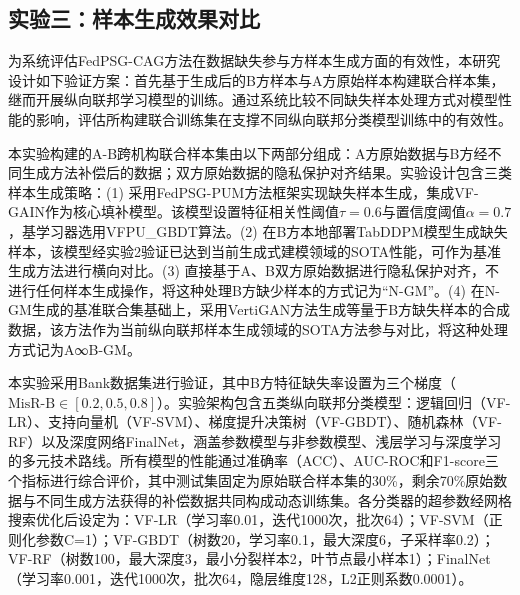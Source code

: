 \subsection{实验三：样本生成效果对比}
为系统评估FedPSG-CAG方法在数据缺失参与方样本生成方面的有效性，本研究设计如下验证方案：首先基于生成后的B方样本与A方原始样本构建联合样本集，继而开展纵向联邦学习模型的训练。通过系统比较不同缺失样本处理方式对模型性能的影响，评估所构建联合训练集在支撑不同纵向联邦分类模型训练中的有效性。

本实验构建的A-B跨机构联合样本集由以下两部分组成：A方原始数据与B方经不同生成方法补偿后的数据；双方原始数据的隐私保护对齐结果。实验设计包含三类样本生成策略：(1) 采用FedPSG-PUM方法框架实现缺失样本生成，集成VF-GAIN作为核心填补模型。该模型设置特征相关性阈值$\tau=0.6$与置信度阈值$\alpha=0.7$，基学习器选用VFPU\_GBDT算法。(2) 在B方本地部署TabDDPM模型生成缺失样本，该模型经实验2验证已达到当前生成式建模领域的SOTA性能，可作为基准生成方法进行横向对比。(3) 直接基于A、B双方原始数据进行隐私保护对齐，不进行任何样本生成操作，将这种处理B方缺少样本的方式记为“N-GM”。(4) 在N-GM生成的基准联合集基础上，采用VertiGAN方法生成等量于B方缺失样本的合成数据，该方法作为当前纵向联邦样本生成领域的SOTA方法参与对比，将这种处理方式记为A∞B-GM。

本实验采用Bank数据集进行验证，其中B方特征缺失率设置为三个梯度（$\text{MisR-B} \in [0.2,0.5,0.8]$）。实验架构包含五类纵向联邦分类模型：逻辑回归（VF-LR）、支持向量机（VF-SVM）、梯度提升决策树（VF-GBDT）、随机森林（VF-RF）以及深度网络FinalNet，涵盖参数模型与非参数模型、浅层学习与深度学习的多元技术路线。所有模型的性能通过准确率（ACC）、AUC-ROC和F1-score三个指标进行综合评价，其中测试集固定为原始联合样本集的30\%，剩余70\%原始数据与不同生成方法获得的补偿数据共同构成动态训练集。各分类器的超参数经网格搜索优化后设定为：VF-LR（学习率0.01，迭代1000次，批次64）；VF-SVM（正则化参数C=1）；VF-GBDT（树数20，学习率0.1，最大深度6，子采样率0.2）；VF-RF（树数100，最大深度3，最小分裂样本2，叶节点最小样本1）；FinalNet（学习率0.001，迭代1000次，批次64，隐层维度128，L2正则系数0.0001）。

